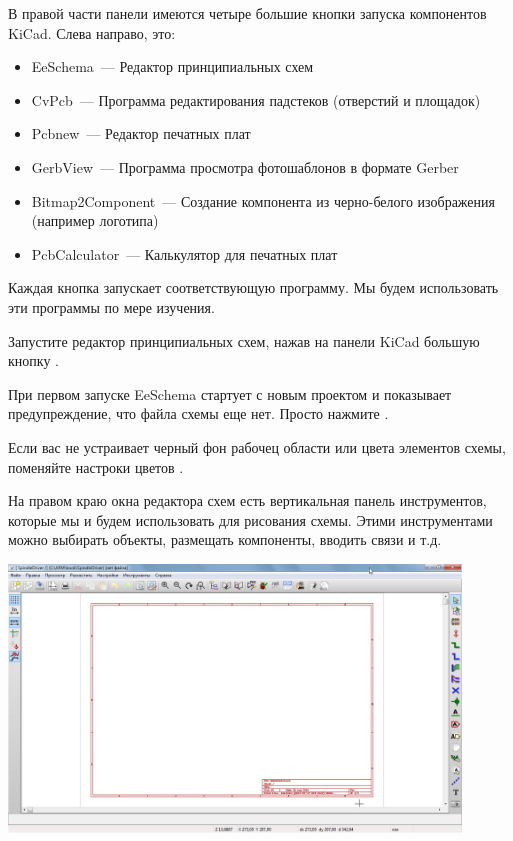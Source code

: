 В правой части панели имеются четыре большие кнопки запуска компонентов KiCad.
Слева направо, это:

\begin{itemize}
\item EeSchema\ --- Редактор принципиальных схем
\item CvPcb\ --- Программа редактирования падстеков (отверстий и площадок)
\item Pcbnew\ --- Редактор печатных плат
\item GerbView\ --- Программа просмотра фотошаблонов в формате Gerber
\item Bitmap2Component\ --- Создание компонента из черно-белого изображения
(например логотипа)
\item PcbCalculator\ --- Калькулятор для печатных плат
\end{itemize}

Каждая кнопка запускает соответствующую программу. Мы будем использовать эти
программы по мере изучения.


Запустите редактор принципиальных схем, нажав на панели KiCad большую кнопку
.

При первом запуске EeSchema стартует с новым проектом и показывает
предупреждение, что файла схемы еще нет. Просто нажмите .

Если вас не устраивает черный фон рабочец области или цвета элементов схемы,
поменяйте настроки цветов . 

На правом краю окна редактора схем есть вертикальная панель инструментов,
которые мы и будем использовать для рисования схемы. Этими инструментами можно
выбирать объекты, размещать компоненты, вводить связи и т.д.

\includegraphics[width=0.9\textwidth]{kicad/ee15.png}

